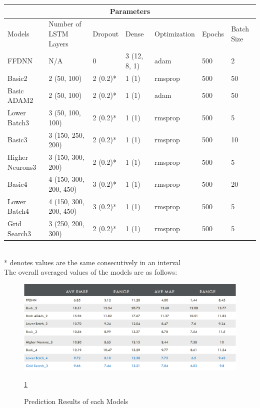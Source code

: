 \documentclass[10pt,11pt,12pt,oneside]{book}
\begin{document}
\begin{tabular}{ |p{2cm}||p{2.5cm}|p{1.5cm}|p{1.5cm}| p{2.5cm} | p{1.5cm}| p{1.5cm} |   }
 \hline
 \multicolumn{7}{|c|}{Parameters} \\
 \hline
Models & Number of LSTM Layers & Dropout & Dense & Optimization & Epochs & Batch Size\\
 \hline
 FFDNN & N/A & 0 & 3 (12, 8, 1) & adam & 500 & 2\\
 \hline
 Basic2 & 2 (50, 100) & 2 (0.2)* & 1 (1) & rmsprop & 500 & 50\\
 \hline
 Basic ADAM2 & 2 (50, 100) & 2 (0.2)* & 1 (1) & adam & 500 & 50\\
 \hline
 Lower Batch3 & 3 (50, 100, 100) & 2 (0.2)* & 1 (1) & rmsprop & 500 & 5\\
 \hline
 Basic3 & 3 (150, 250, 200) & 2 (0.2)* & 1 (1) & rmsprop & 500 & 10\\
 \hline
Higher Neurons3 & 3 (150, 300, 200) & 2 (0.2)* & 1 (1) & rmsprop & 500 & 5\\
 \hline
 Basic4 & 4 (150, 300, 200, 450) & 3 (0.2)* & 1 (1) & rmsprop & 500 & 20\\
 \hline
 Lower Batch4 & 4 (150, 300, 200, 450) & 3 (0.2)* & 1 (1) & rmsprop & 500 & 5\\
 \hline
 Grid Search3 & 3 (250, 200, 300) & 2 (0.2)* & 1 (1) & rmsprop & 500 & 5\\
 \hline


 \hline
\end{tabular}
    \\ * denotes values are the same consecutively in an interval\\
    The overall averaged values of the models are as follows:
    \begin{figure}[H]
         \includegraphics[width=\linewidth]{results.png}
         \caption{Prediction Results of each Models}
         \label{fig:results}
         \ref{fig:results}
\end{figure}
\end{document}
